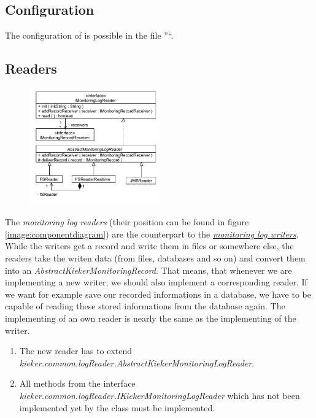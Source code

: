 \documentclass[a4paper, oneside, 11pt]{scrartcl}
\begin{document}
\section{\KiekerAnalysis}
\subsection{Configuration}
The configuration of \KiekerAnalysis is possible in the file ''\analysisPropertiesFile``.
\subsection{Readers}
\begin{figure}[H]
	\begin{center}
		\includegraphics[width=0.5\textwidth]{kieker_readerimpls.pdf}
		\label{image:readers}
		\caption{}
	\end{center}
\end{figure}
The \textit{monitoring log readers} (their position can be found in figure \ref{image:componentdiagram}) are the counterpart to the \hyperlink{monitoringlogwriters}{\textit{monitoring log writers}}. While the writers get a record and write them in files or somewhere else, the readers take the writen data (from files, databases and so on) and convert them into an \textit{AbstractKiekerMonitoringRecord}. That means, that whenever we are implementing a new writer, we should also implement a corresponding reader. If we want for example save our recorded informations in a database, we have to be capable of reading these stored informations from the database again. The implementing of an own reader is nearly the same as the implementing of the writer.
\begin{enumerate}
 \item The new reader has to extend \textit{kieker.common.logReader.AbstractKiekerMonitoringLogReader}.
 \item All methods from the interface  \textit{kieker.common.logReader.IKiekerMonitoringLogReader} which has not been implemented yet by the class must be implemented.
\end{enumerate}
\end{document}
